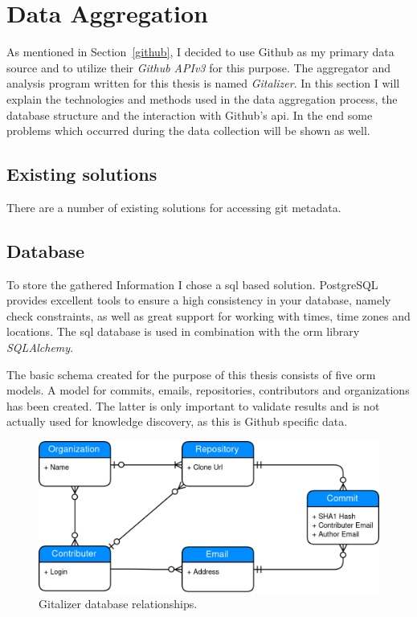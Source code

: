\section{Data Aggregation}\label{aggregator}
As mentioned in Section~\ref{github}, I decided to use Github as my primary data source and to utilize their \emph{Github APIv3} for this purpose.
The aggregator and analysis program written for this thesis is named \emph{Gitalizer}.
In this section I will explain the technologies and methods used in the data aggregation process, the database structure and the interaction with Github's \ac{api}.
In the end some problems which occurred during the data collection will be shown as well.


\subsection{Existing solutions}

There are a number of existing solutions for accessing git metadata.


\subsection{Database}\label{gitalizer-database}
To store the gathered Information I chose a \ac{sql} based solution.
PostgreSQL provides excellent tools to ensure a high consistency in your database, namely check constraints, as well as great support for working with times, time zones and locations.
The \ac{sql} database is used in combination with the \ac{orm} library \emph{SQLAlchemy}.

The basic schema created for the purpose of this thesis consists of five \ac{orm} models.
A model for commits, emails, repositories, contributors and organizations has been created.
The latter is only important to validate results and is not actually used for knowledge discovery, as this is Github specific data.

\begin{figure}[H]
\includegraphics[scale=0.3]{./graphs/gitalizer-data-structure}
\centering
\caption{Gitalizer database relationships.}\label{fig:gitalizer-relationship}
\end{figure}

